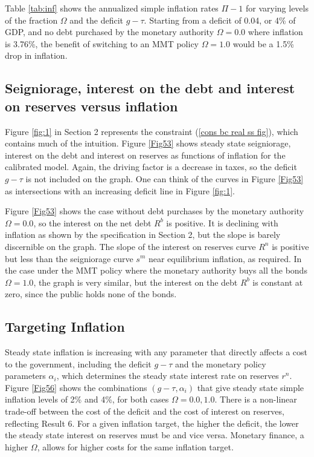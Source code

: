 \documentclass[]{article}
\begin{document}
Table \ref{tab:inf} shows the annualized simple inflation rates $\Pi-1$ for varying levels of the fraction $\Omega$ and the deficit $g-\tau$. Starting from a deficit of 0.04, or 4\% of GDP, and no debt purchased by the monetary authority $\Omega=0.0$ where inflation is 3.76\%, the benefit of switching to an MMT policy $\Omega=1.0$ would be a 1.5\% drop in inflation. 

\subsection{Seigniorage, interest on the debt and interest on reserves versus inflation}

Figure \ref{fig:1} in Section 2 represents the constraint (\ref{cons bc real ss fig}), which contains much of the intuition. Figure \ref{Fig53} shows steady state seigniorage, interest on the debt and interest on reserves as functions of inflation for the calibrated model. Again, the driving factor is a decrease in taxes, so the deficit $g-\tau$ is not included on the graph. One can think of the curves in Figure \ref{Fig53} as intersections with an increasing deficit line in Figure \ref{fig:1}.

Figure \ref{Fig53} shows the case without debt purchases by the monetary authority $\Omega=0.0$, so the interest on the net debt $R^{b}$ is positive. It is declining with inflation as shown by the specification in Section 2, but the slope is barely discernible on the graph. The slope of the interest on reserves curve $R^{n}$ is positive but less than the seigniorage curve $s^{m}$ near equilibrium inflation, as required. In the case under the MMT policy where the monetary authority buys all the bonds $\Omega=1.0$, the graph is very similar, but the interest on the debt $R^{b}$ is constant at zero, since the public holds none of the bonds.

\subsection{Targeting Inflation}

Steady state inflation is increasing with any parameter that directly affects a cost to the government, including the deficit $g-\tau$ and the monetary policy parameters $\alpha_{i}$, which determines the steady state interest rate on reserves $r^{n}$. Figure \ref{Fig56} shows the combinations $(g-\tau,\alpha_{i})$ that give steady state simple inflation levels of 2\% and 4\%, for both cases $\Omega=0.0,1.0$. There is a non-linear trade-off between the cost of the deficit and the cost of interest on reserves, reflecting Result 6. For a given inflation target, the higher the deficit, the lower the steady state interest on reserves must be and vice versa. Monetary finance, a higher $\Omega$, allows for higher costs for the same inflation target.
\end{document}
